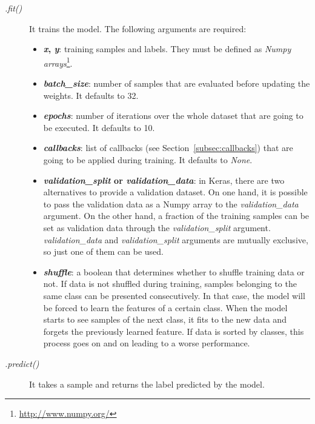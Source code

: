 \begin{description}
	\item[\textit{.fit()}] It trains the model. The following arguments are required:
	\begin{itemize}
		\item \textbf{\textit{x}, \textit{y}}: training samples and labels. They must be defined as \emph{Numpy arrays}\footnote{\url{http://www.numpy.org/}}.
		
		\item \textbf{\textit{batch\_size}}: number of samples that are evaluated before updating the weights. It defaults to 32.
		
		\item \textbf{\textit{epochs}}: number of iterations over the whole dataset that are going to be executed. It defaults to 10.
		
		\item \textbf{\textit{callbacks}}: list of callbacks (see Section~\ref{subsec:callbacks}) that are going to be applied during training. It defaults to \textit{None}.
		
		\item \textbf{\textit{validation\_split} or \textit{validation\_data}}: in Keras, there are two alternatives to provide a validation dataset. On one hand, it is possible to pass the validation data as a Numpy array to the \textit{validation\_data} argument. On the other hand, a fraction of the training samples can be set as validation data through the \textit{validation\_split} argument. \textit{validation\_data} and  \textit{validation\_split} arguments are mutually exclusive, so just one of them can be used.
		
		\item \textbf{\textit{shuffle}}: a boolean that determines whether to shuffle training data or not. If data is not shuffled during training, samples belonging to the same class can be presented consecutively. In that case, the model will be forced to learn the features of a certain class. When the model starts to see samples of the next class, it fits to the new data and forgets the previously learned feature. If data is sorted by classes, this process goes on and on leading to a worse performance.
	\end{itemize}
\end{description}

\begin{description}
	\item[\textit{.predict()}] It takes a sample and returns the label predicted by the model.
\end{description}

